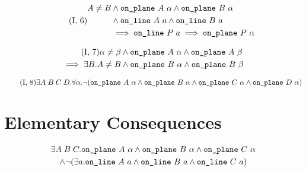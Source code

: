 \begin{equation}\label{eq:g16}
  \tag{I,~6}
  \begin{split}
    A \neq B &\wedge \code{on\_plane}\ A\ \alpha \wedge \code{on\_plane}\ B\ \alpha\\
    &\wedge \code{on\_line}\ A\ a \wedge \code{on\_line}\ B\ a\\
    &\implies \code{on\_line}\ P\ a \implies \code{on\_plane}\ P\ \alpha
  \end{split}
\end{equation}

\begin{multline}
\label{eq:g17}
  \tag{I,~7}
   \alpha \neq \beta \wedge \texttt{on\_plane}\ A\ \alpha \wedge \texttt{on\_plane}\ A\ \beta\\
   \implies \exists B. A \neq B \wedge \texttt{on\_plane}\ B\ \alpha \wedge \texttt{on\_plane}\ B\ \beta
\end{multline}

\begin{equation}
\label{eq:g18}
  \tag{I,~8}
  \exists A\;B\;C\;D. \forall \alpha. \neg(\texttt{on\_plane}\ A\ \alpha \wedge \texttt{on\_plane}\ B\ \alpha \wedge \texttt{on\_plane}\ C\ \alpha \wedge \texttt{on\_plane}\ D\ \alpha)
\end{equation}

\section{Elementary Consequences}
\begin{multline}\label{eq:PlaneThree}
  \exists A\;B\;C. \code{on\_plane}\ A\ \alpha\wedge\code{on\_plane}\ B\ \alpha\wedge\code{on\_plane}\ C\ \alpha\\
  \wedge \Triangle{a}{A}{B}{C}
\end{multline}

